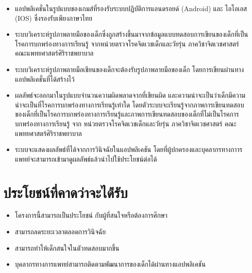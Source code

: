 \documentclass[12pt,oneside,openright,a4paper]{cpe-thai-project}
\begin{document}
\begin{itemize}
\item  แอปพลิเคชั่นในรูปแบบของเกมส์ที่รองรับระบบปฏิบัติการแอนดรอยด์ (Android)  และ ไอโอเอส (IOS) ซึ่งรองรับเพียงภาษาไทย 
\item  ระบบวิเคราะห์รูปภาพลายมือของเด็กซึ่งถูกสร้างขึ้นมาจากข้อมูลแบบทดสอบการเขียนของเด็กที่เป็นโรคการบกพร่องทางการเรียนรู้ จากหน่วยตรวจโรคจิตเวชเด็กและวัยรุ่น ภาควิชาจิตเวชศาสตร์ คณะแพทยศาสตร์ศิริราชพยาบาล
\item  ระบบวิเคราะห์รูปภาพลายมือเขียนของเด็กจะต้องรับรูปภาพลายมือของเด็ก โดยการเขียนผ่านทางแอปพลิเคชั่นที่ได้สร้างไว้
\item  ผลลัพธ์จะออกมาในรูปแบบจำนวนความผิดพลาดจากที่เขียนผิด และความน่าจะเป็นว่าเด็กมีความน่าจะเป็นที่โรคการบกพร่องทางการเรียนรู้เท่าใด โดยตัวระบบจะเรียนรู้จากภาพการเขียนทดสอบของเด็กที่เป็นโรคการบกพร่องทางการเรียนรู้และภาพการเขียนทดสอบของเด็กที่ไม่เป็นโรคการบกพร่องทางการเรียนรู้ จาก หน่วยตรวจโรคจิตเวชเด็กและวัยรุ่น ภาควิชาจิตเวชศาสตร์ คณะแพทยศาสตร์ศิริราชพยาบาล
\item  ระบบจะแสดงผลลัพธ์ที่ได้จากการวินิจฉัยในแอปพลิเคชัน โดยที่ผู้ปกครองและบุคลากรทางกาารแพทย์จะสามารถเข้ามาดูผลลัพธ์แล้วนำไปใช้ประโยชน์ต่อได้
\end{itemize}

\section{ประโยชน์ที่คาดว่าจะได้่รับ}
\begin{itemize}
  \item โครงการนี้สามารถเป็นประโยชน์ กับผู้ที่สนใจหรือต้องการศึกษา
  \item สามารถลดระยะเวลาตลอดการวินิจฉัย
  \item สามารถทำให้เด็กสนใจในตัวทดสอบมากขึ้น
  \item บุคลากรทางการแพทย์สามารถติดตามพัฒนาการของเด็กได้ผ่านทางแอปพลิเคชัน
\end{itemize}
\end{document}
